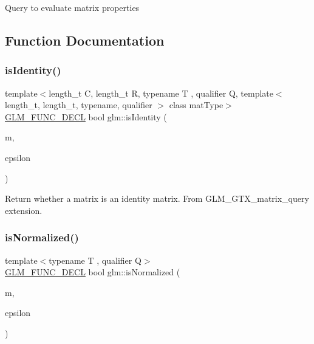 Query to evaluate matrix properties 

\subsection{Function Documentation}
\mbox{\label{group__gtx__matrix__query_gaee935d145581c82e82b154ccfd78ad91}} 
\subsubsection{\texorpdfstring{is\+Identity()}{isIdentity()}}
{\footnotesize\ttfamily template$<$length\+\_\+t C, length\+\_\+t R, typename T , qualifier Q, template$<$ length\+\_\+t, length\+\_\+t, typename, qualifier $>$ class mat\+Type$>$ \\
\hyperlink{setup_8hpp_ab2d052de21a70539923e9bcbf6e83a51}{G\+L\+M\+\_\+\+F\+U\+N\+C\+\_\+\+D\+E\+CL} bool glm\+::is\+Identity (\begin{DoxyParamCaption}\item[{mat\+Type$<$ C, R, T, Q $>$ const \&}]{m,  }\item[{T const \&}]{epsilon }\end{DoxyParamCaption})}

Return whether a matrix is an identity matrix. From G\+L\+M\+\_\+\+G\+T\+X\+\_\+matrix\+\_\+query extension. \mbox{\label{group__gtx__matrix__query_gae785af56f47ce220a1609f7f84aa077a}} 
\subsubsection{\texorpdfstring{is\+Normalized()}{isNormalized()}\hspace{0.1cm}{\footnotesize\ttfamily [1/3]}}
{\footnotesize\ttfamily template$<$typename T , qualifier Q$>$ \\
\hyperlink{setup_8hpp_ab2d052de21a70539923e9bcbf6e83a51}{G\+L\+M\+\_\+\+F\+U\+N\+C\+\_\+\+D\+E\+CL} bool glm\+::is\+Normalized (\begin{DoxyParamCaption}\item[{\hyperlink{structglm_1_1mat}{mat}$<$ 2, 2, T, Q $>$ const \&}]{m,  }\item[{T const \&}]{epsilon }\end{DoxyParamCaption})}

